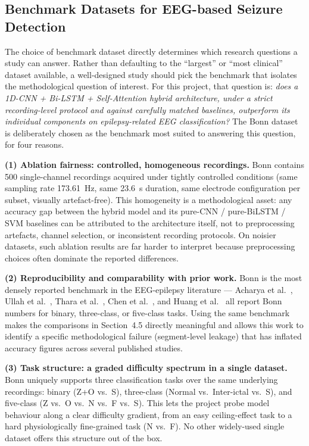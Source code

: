 \subsection{Benchmark Datasets for EEG-based Seizure Detection}

The choice of benchmark dataset directly determines which research questions a study can answer. Rather than defaulting to the ``largest'' or ``most clinical'' dataset available, a well-designed study should pick the benchmark that isolates the methodological question of interest. For this project, that question is: \textit{does a 1D-CNN + Bi-LSTM + Self-Attention hybrid architecture, under a strict recording-level protocol and against carefully matched baselines, outperform its individual components on epilepsy-related EEG classification?} The Bonn dataset is deliberately chosen as the benchmark most suited to answering this question, for four reasons.

\textbf{(1) Ablation fairness: controlled, homogeneous recordings.} Bonn \cite{andrzejak2001} contains 500 single-channel recordings acquired under tightly controlled conditions (same sampling rate 173.61~Hz, same 23.6~s duration, same electrode configuration per subset, visually artefact-free). This homogeneity is a methodological asset: any accuracy gap between the hybrid model and its pure-CNN / pure-BiLSTM / SVM baselines can be attributed to the architecture itself, not to preprocessing artefacts, channel selection, or inconsistent recording protocols. On noisier datasets, such ablation results are far harder to interpret because preprocessing choices often dominate the reported differences.

\textbf{(2) Reproducibility and comparability with prior work.} Bonn is the most densely reported benchmark in the EEG-epilepsy literature --- Acharya et al.\ \cite{acharya2018}, Ullah et al.\ \cite{ullah2018}, Thara et al.\ \cite{thara2019}, Chen et al.\ \cite{chen2023}, and Huang et al.\ \cite{huang2025} all report Bonn numbers for binary, three-class, or five-class tasks. Using the same benchmark makes the comparisons in Section~4.5 directly meaningful and allows this work to identify a specific methodological failure (segment-level leakage) that has inflated accuracy figures across several published studies.

\textbf{(3) Task structure: a graded difficulty spectrum in a single dataset.} Bonn uniquely supports three classification tasks over the same underlying recordings: binary (Z+O vs.\ S), three-class (Normal vs.\ Inter-ictal vs.\ S), and five-class (Z vs.\ O vs.\ N vs.\ F vs.\ S). This lets the project probe model behaviour along a clear difficulty gradient, from an easy ceiling-effect task to a hard physiologically fine-grained task (N vs.\ F). No other widely-used single dataset offers this structure out of the box.

